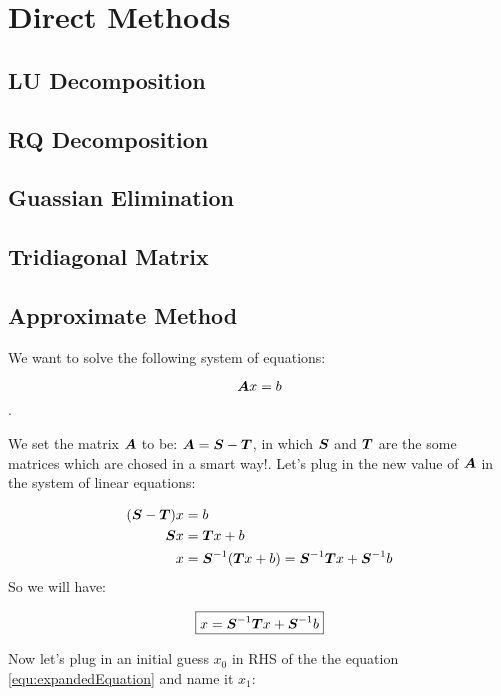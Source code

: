 



\section{Direct Methods}
\subsection{LU Decomposition}

\subsection{RQ Decomposition}

\subsection{Guassian Elimination}

\subsection{Tridiagonal Matrix}

\subsection{Approximate Method}

We want to solve the following system of equations:

\[ \boldsymbol{A} x = b \].

We set the matrix $\boldsymbol{A}$ to be: $\boldsymbol{A} = \boldsymbol{S} - \boldsymbol{T}$, in which $\boldsymbol{S}$ and $\boldsymbol{T}$ are the some matrices which are chosed in a smart way!. Let's plug in the new value of $\boldsymbol{A}$ in the system of linear equations:

\begin{align*}
	(\boldsymbol{S} - \boldsymbol{T}) x &= b \\
	\boldsymbol{S} x &= \boldsymbol{T} x + b \\
	x &= \boldsymbol{S}^{-1} (\boldsymbol{T} x + b) =  \boldsymbol{S}^{-1} \boldsymbol{T} x + \boldsymbol{S}^{-1} b \\
\end{align*}
So we will have:

\begin{equation}
	\boxed{x = \boldsymbol{S}^{-1} \boldsymbol{T} x + \boldsymbol{S}^{-1} b}
	\label{equ:expandedEquation}
\end{equation}

Now let's plug in an initial guess $x_0$ in RHS of the the equation \ref{equ:expandedEquation} and name it $x_1$:



